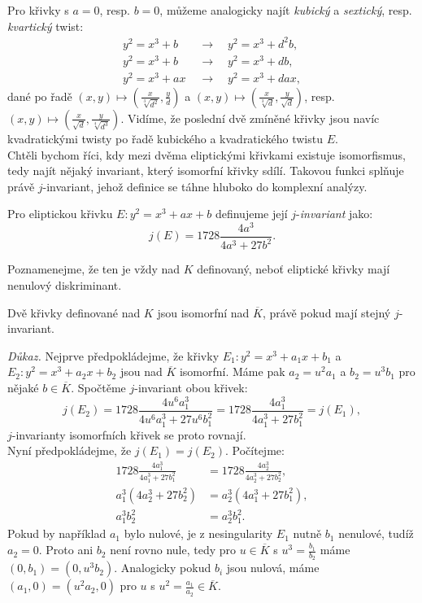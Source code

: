 \documentclass [12pt]{report}
\begin{document}
Pro křivky s $a=0$, resp. $b=0$, můžeme analogicky najít \textit{kubický} a \textit{sextický}, resp. \textit{kvartický} twist:
\begin{align*}
y^2 = x^3 + b \quad &\longrightarrow \quad y^2 = x^3 + d^2 b ,\\
y^2 = x^3 + b \quad &\longrightarrow \quad y^2 = x^3 + d b, \\
y^2 = x^3 +ax \; &\longrightarrow \quad y^2 = x^3 + d ax ,
\end{align*}
dané po řadě $(x,y)  \mapsto \left(\frac{x}{\sqrt[3]{d^2}}, \frac{y}{d}\right)$ a $(x,y)  \mapsto \left(\frac{x}{\sqrt[3]{d}}, \frac{y}{\sqrt{d}}\right)$, resp. $(x,y)  \mapsto \left(\frac{x}{\sqrt{d}}, \frac{y}{\sqrt[4]{d^3}}\right)$. Vidíme, že poslední dvě zmíněné křivky jsou navíc kvadratickými twisty po řadě kubického a kvadratického twistu $E$.\\


Chtěli bychom říci, kdy mezi dvěma eliptickými křivkami existuje isomorfismus, tedy najít nějaký invariant, který isomorfní křivky sdílí. Takovou funkci splňuje právě $j$-invariant, jehož definice se táhne hluboko do komplexní analýzy.

\begin{definice}
Pro eliptickou křivku $E: y^2 = x^3 + ax + b$ definujeme její $j$-\textit{invariant} jako:
\begin{equation*}
j(E) = 1728 \frac{4a^3}{4a^3+27b^2}.
\end{equation*}
\end{definice}
Poznamenejme, že ten je vždy nad $K$ definovaný, neboť eliptické křivky mají nenulový diskriminant.
\begin{veta}
Dvě křivky definované nad $K$ jsou isomorfní nad $\overline{K}$, právě pokud mají stejný $j$-invariant.
\end{veta}

\noindent \textit{Důkaz. } Nejprve předpokládejme, že křivky $E_1: y^2 = x^3+a_1x+b_1$ a $E_2 : y^2 = x^3+a_2 x + b_2$ jsou nad $\overline{K}$ isomorfní. Máme pak $a_2 = u^2 a_1$ a $b_2 = u^3 b_1$ pro nějaké $b \in \overline{K}$. Spočtěme $j$-invariant obou křivek:
\begin{equation*}
j(E_2) = 1728 \frac{4 u^6 a_1^3}{4 u^6 a_1^3 + 27 u^6 b_1^2} = 1728 \frac{4 a_1^3}{4a_1^3 + 27 b_1^2} = j(E_1),
\end{equation*}
$j$-invarianty isomorfních křivek se proto rovnají.\\

Nyní předpokládejme, že $j(E_1) = j(E_2)$. Počítejme:
\begin{align*}
1728 \frac{4 a_1^3}{4 a_1^3 + 27 b_1^2} &= 1728 \frac{4 a_2^3}{4a_2^3 + 27 b_2^2},\\
a_1^3 (4 a_2^3 + 27b_2^2) &= a_2^3 (4a_1 ^3 + 27 b_1^2),\\
a_1^3 b_2^2 &= a_2^3 b_1^2.
\end{align*}
Pokud by například $a_1$ bylo nulové, je z nesingularity $E_1$ nutně $b_1$ nenulové, tudíž $a_2 = 0$. Proto ani $b_2$ není rovno nule, tedy pro $u \in \overline{K}$ s $u^3 = \frac{b_1}{b_2}$ máme $(0,b_1) = (0,u^3 b_2)$. Analogicky pokud $b_i$ jsou nulová, máme $(a_1,0) = (u^2 a_2,0)$ pro $u$ s $u^2  = \frac{a_1}{a_2} \in \overline{K}$.\\
\end{document}
